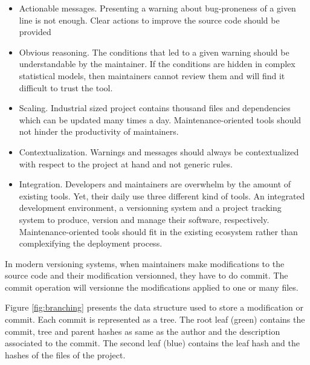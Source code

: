 \begin{itemize}
	\item Actionable messages. Presenting a warning about bug-proneness of a given line is not enough.
	Clear actions to improve the source code should be provided
	\item Obvious reasoning. The conditions that led to a given warning should be understandable by the maintainer.
	If the conditions are hidden in complex statistical models, then maintainers cannot review them and will find it difficult to trust the tool.
	\item Scaling. Industrial sized project contains thousand files and dependencies which can be updated many times a day.
	Maintenance-oriented tools should not hinder the productivity of maintainers.
	\item Contextualization. Warnings and messages should always be contextualized with respect to the project at hand and not generic rules.
	\item Integration. Developers and maintainers are overwhelm by the amount of existing tools.
	Yet, their daily use three different kind of tools.
	An integrated development environment, a versionning system and a project tracking system to produce, version and manage their software, respectively.
	Maintenance-oriented tools should fit in the existing ecosystem rather than complexifying the deployment process.
\end{itemize}

In modern versioning systems, when maintainers make modifications to the source code and their modification versionned, they have to do commit.
The commit operation will versionne the modifications applied to one or many files.

Figure \ref{fig:branching} presents the data structure used to store a modification or commit.
Each commit is represented as a tree.
The root leaf (green) contains the commit, tree and parent hashes as same as the author and the description associated to the commit.
The second leaf (blue) contains the leaf hash and the hashes of the files of the project.

